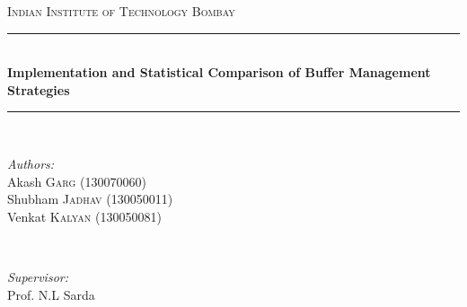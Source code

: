 \begin{titlepage}

\newcommand{\HRule}{\rule{\linewidth}{0.5mm}} %

\center %
 
 
\textsc{\LARGE Indian Institute of Technology Bombay}\\%


\HRule \\[0.4cm]
{ \huge \bfseries Implementation and Statistical Comparison of Buffer Management Strategies}\\[0.4cm] %
\HRule \\[1cm]
 

\begin{minipage}{0.4\textwidth}
\begin{flushleft} \large
\emph{Authors:}\\
Akash \textsc{Garg} (130070060)\\
Shubham \textsc{Jadhav} (130050011)\\
Venkat \textsc{Kalyan} (130050081)\\
\end{flushleft}
\end{minipage}
~
\begin{minipage}{0.4\textwidth}
\begin{flushright} \large
\emph{Supervisor:} \\
Prof. N.L Sarda %
\end{flushright}
\end{minipage}\\%


\end{titlepage}
